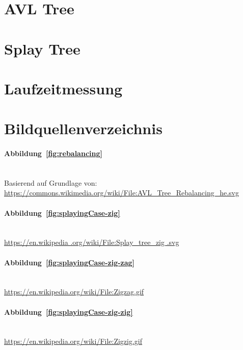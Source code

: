 \documentclass[a4paper]{article}
\begin{document}
    \section{AVL Tree}\label{sec:avl-tree}
    

    \FloatBarrier
    \newpage

    \section{Splay Tree}\label{sec:splay-tree}
    

    \FloatBarrier
    \newpage

    \section{Laufzeitmessung}\label{sec:laufzeitmessung}
    

    \FloatBarrier
    \newpage
    \appendix

    \section{Bildquellenverzeichnis}\label{sec:bildquellen}

    \paragraph{Abbildung~\ref{fig:rebalancing}}\mbox{}\\

    Basierend auf Grundlage von:\\
    \url{https://commons.wikimedia.org/wiki/File:AVL_Tree_Rebalancing_he.svg}

    \paragraph{Abbildung~\ref{fig:splayingCase-zig}}\mbox{}\\

    \url{https://en.wikipedia .org/wiki/File:Splay_tree_zig .svg}

    \paragraph{Abbildung~\ref{fig:splayingCase-zig-zag}}\mbox{}\\

    \url{https://en.wikipedia.org/wiki/File:Zigzag.gif}

    \paragraph{Abbildung~\ref{fig:splayingCase-zig-zig}}\mbox{}\\

    \url{https://en.wikipedia.org/wiki/File:Zigzig.gif}
\end{document}
